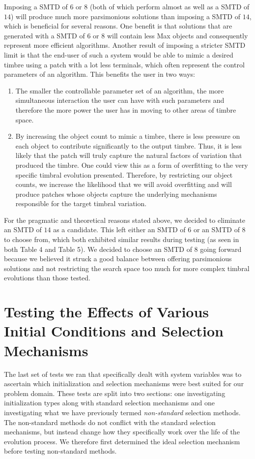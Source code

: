 \documentclass[12pt]{report} 	%
\numberwithin{figure}{chapter}
\numberwithin{table}{chapter}
\numberwithin{equation}{chapter}
\begin{document}
\begin{flushleft}
Imposing a SMTD of $6$ or $8$ (both of which perform almost as well as a SMTD of $14$) will produce much more parsimonious solutions than imposing a SMTD of $14$, which is beneficial for several reasons. One benefit is that solutions that are generated with a SMTD of $6$ or $8$ will contain less Max objects and consequently represent more efficient algorithms. Another result of imposing a stricter SMTD limit is that the end-user of such a system would be able to mimic a desired timbre using a patch with a lot less terminals, which often represent the control parameters of an algorithm. This benefits the user in two ways:
\begin{enumerate}
\item The smaller the controllable parameter set of an algorithm, the more simultaneous interaction the user can have with such parameters and therefore the more power the user has in moving to other areas of timbre space.
\item By increasing the object count to mimic a timbre, there is less pressure on each object to contribute significantly to the output timbre. Thus, it is less likely that the patch will truly capture the natural factors of variation that produced the timbre. One could view this as a form of overfitting to the very specific timbral evolution presented. Therefore, by restricting our object counts, we increase the likelihood that we will avoid overfitting and will produce patches whose objects capture the underlying mechanisms responsible for the target timbral variation.
\end{enumerate}

For the pragmatic and theoretical reasons stated above, we decided to eliminate an SMTD of $14$ as a candidate. This left either an SMTD of $6$ or an SMTD of $8$ to choose from, which both exhibited similar results during testing (as seen in both Table 4 and Table 5). We decided to choose an SMTD of $8$ going forward because we believed it struck a good balance between offering parsimonious solutions and not restricting the search space too much for more complex timbral evolutions than those tested. 

\vspace{12pt}\section{Testing the Effects of Various Initial Conditions and Selection Mechanisms}
The last set of tests we ran that specifically dealt with system variables was to ascertain which initialization and selection mechanisms were best suited for our problem domain. These tests are split into two sections: one investigating initialization types along with standard selection mechanisms and one investigating what we have previously termed \textit{non-standard} selection methods. The non-standard methods do not conflict with the standard selection mechanisms, but instead change how they specifically work over the life of the evolution process. We therefore first determined the ideal selection mechanism before testing non-standard methods.


\end{flushleft}
\end{document}
